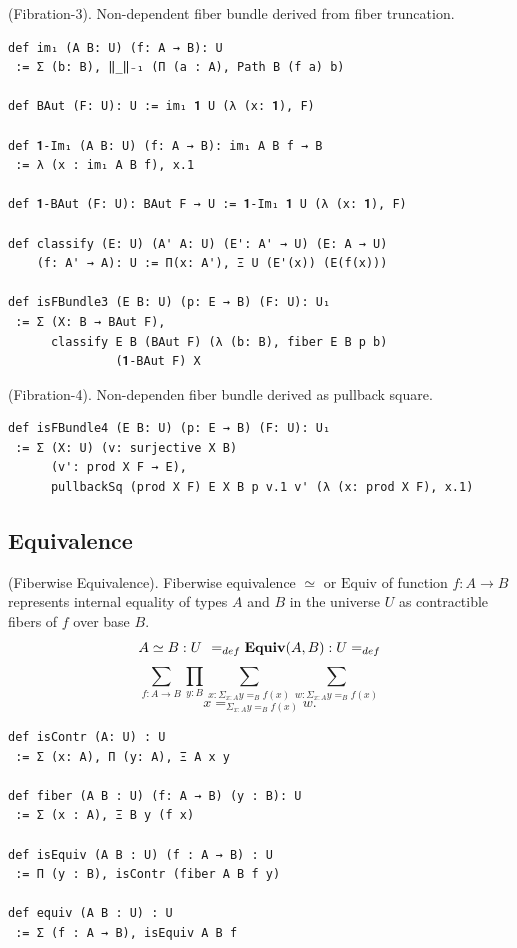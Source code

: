 \documentclass{article}
\begin{document}
\begin{definition} (Fibration-3). Non-dependent fiber bundle derived from fiber truncation.
\begin{lstlisting}[mathescape=true]
def im₁ (A B: U) (f: A → B): U
 := Σ (b: B), ‖_‖₋₁ (Π (a : A), Path B (f a) b)

def BAut (F: U): U := im₁ 𝟏 U (λ (x: 𝟏), F)

def 𝟏-Im₁ (A B: U) (f: A → B): im₁ A B f → B
 := λ (x : im₁ A B f), x.1

def 𝟏-BAut (F: U): BAut F → U := 𝟏-Im₁ 𝟏 U (λ (x: 𝟏), F)

def classify (E: U) (A' A: U) (E': A' → U) (E: A → U)
    (f: A' → A): U := Π(x: A'), Ξ U (E'(x)) (E(f(x)))

def isFBundle3 (E B: U) (p: E → B) (F: U): U₁
 := Σ (X: B → BAut F),
      classify E B (BAut F) (λ (b: B), fiber E B p b)
               (𝟏-BAut F) X
\end{lstlisting}
\end{definition}

\begin{definition} (Fibration-4). Non-dependen fiber bundle derived as pullback square.
\begin{lstlisting}
def isFBundle4 (E B: U) (p: E → B) (F: U): U₁
 := Σ (X: U) (v: surjective X B)
      (v': prod X F → E),
      pullbackSq (prod X F) E X B p v.1 v' (λ (x: prod X F), x.1)
\end{lstlisting}
\end{definition}



\newpage
\subsection{Equivalence}

\begin{definition} (Fiberwise Equivalence).
Fiberwise equivalence $\simeq$ or $\mathrm{Equiv}$
of function $f: A \rightarrow B$
represents internal equality of types $A$ and $B$
in the universe $U$ as contractible fibers of $f$
over base $B$.
$$
A\simeq B : U\hspace{.4em}=_{def}\mathbf{Equiv}(A,B) : U =_{def}
$$
$$
\sum_{f: A \rightarrow B}
\prod_{y:B}
\sum_{x: \Sigma_{x:A} y =_B f(x)}
\sum_{w: \Sigma_{x:A} y =_B f(x)}
$$
$$
  x =_{\Sigma_{x:A} y =_B f(x)} w.
$$
\begin{lstlisting}
def isContr (A: U) : U
 := Σ (x: A), Π (y: A), Ξ A x y

def fiber (A B : U) (f: A → B) (y : B): U
 := Σ (x : A), Ξ B y (f x)

def isEquiv (A B : U) (f : A → B) : U
 := Π (y : B), isContr (fiber A B f y)

def equiv (A B : U) : U
 := Σ (f : A → B), isEquiv A B f
\end{lstlisting}
\end{definition}
\end{document}
